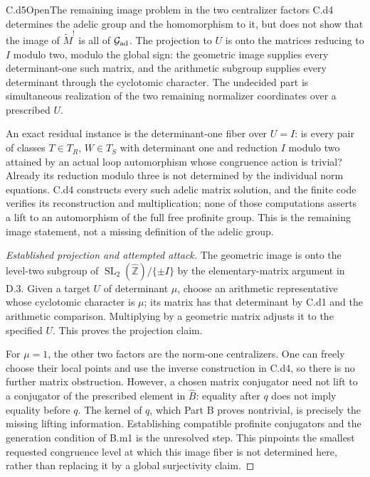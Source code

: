 \begin{claim}{C.d5}{Open}{The remaining image problem in the two centralizer factors}
C.d4 determines the adelic group and the homomorphism to it, but does not show that the image of $\widetilde M^!$ is all of $\mathcal G_{\rm ad}$. The projection to $U$ is onto the matrices reducing to $I$ modulo two, modulo the global sign: the geometric image supplies every determinant-one such matrix, and the arithmetic subgroup supplies every determinant through the cyclotomic character. The undecided part is simultaneous realization of the two remaining normalizer coordinates over a prescribed $U$.

An exact residual instance is the determinant-one fiber over $U=I$: is every pair of classes $T\in T_R$, $W\in T_S$ with determinant one and reduction $I$ modulo two attained by an actual loop automorphism whose congruence action is trivial? Already its reduction modulo three is not determined by the individual norm equations. C.d4 constructs every such adelic matrix solution, and the finite code verifies its reconstruction and multiplication; none of those computations asserts a lift to an automorphism of the full free profinite group. This is the remaining image statement, not a missing definition of the adelic group.
\end{claim}

\begin{proof}[Established projection and attempted attack]
The geometric image is onto the level-two subgroup of $\operatorname{SL}_2(\widehat{\mathbb Z})/\{\pm I\}$ by the elementary-matrix argument in D.3. Given a target $U$ of determinant $\mu$, choose an arithmetic representative whose cyclotomic character is $\mu$; its matrix has that determinant by C.d1 and the arithmetic comparison. Multiplying by a geometric matrix adjusts it to the specified $U$. This proves the projection claim.

For $\mu=1$, the other two factors are the norm-one centralizers. One can freely choose their local points and use the inverse construction in C.d4, so there is no further matrix obstruction. However, a chosen matrix conjugator need not lift to a conjugator of the prescribed element in $\widehat B$: equality after $q$ does not imply equality before $q$. The kernel of $q$, which Part B proves nontrivial, is precisely the missing lifting information. Establishing compatible profinite conjugators and the generation condition of B.m1 is the unresolved step. This pinpoints the smallest requested congruence level at which this image fiber is not determined here, rather than replacing it by a global surjectivity claim.
\end{proof}
